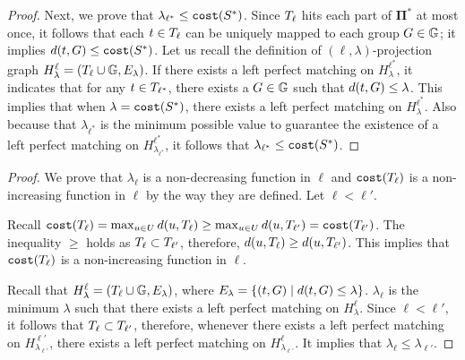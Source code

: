 \documentclass{article}
\begin{document}
\begin{proof}
Next, we prove that $\lambda_{\ell^*} \leq \texttt{cost}(S^*)$. 
Since $T_{\ell}$ hits each part of $\mathbf{\Pi}^*$ at most once, it follows that each $t \in T_{\ell}$ can be uniquely mapped to each group $G \in \mathbb{G}$; it implies $d(t, G) \leq \texttt{cost}(S^*)$.
Let us recall the definition of $(\ell,\lambda)$-projection graph $H^{\ell}_{\lambda} = (T_{\ell} \cup \mathbb{G}, E_{\lambda})$.
If there exists a left perfect matching on $H^{\ell^*}_{\lambda}$, it indicates that for any $t \in T_{\ell^*}$, there exists a $G \in \mathbb{G}$ such that $d(t, G) \leq \lambda$.
This implies that when $\lambda = \texttt{cost}(S^*)$, there exists a left perfect matching on $H^{\ell^*}_{\lambda}$.
Also because that $\lambda_{\ell^*}$ is the minimum possible value to guarantee the existence of a left perfect matching on $H^{\ell^*}_{\lambda_{\ell^*}}$, it follows that $\lambda_{\ell^*} \leq \texttt{cost}(S^*)$.
\end{proof}

\monotonicitypropertiesoflambdaell* 
\begin{proof}
    We prove that $\lambda_{\ell}$ is a non-decreasing function in $\ell$ and $\texttt{cost}(T_{\ell})$ is a non-increasing function in $\ell$ by the way they are defined. 
    Let $\ell < \ell'$.

    Recall $\texttt{cost}(T_{\ell}) = \max_{u \in U} d(u, T_{\ell}) \geq \max_{u \in U} d(u, T_{\ell'}) = \texttt{cost}(T_{\ell'})$. 
    The inequality $\geq$ holds as $T_{\ell} \subset T_{\ell'}$, therefore, $d(u, T_{\ell}) \geq d(u, T_{\ell'})$. 
    This implies that $\texttt{cost}(T_{\ell})$ is a non-increasing function in $\ell$.

    Recall that $H^{\ell}_{\lambda} = (T_{\ell} \cup \mathbb{G}, E_{\lambda})$, where $E_{\lambda} = \{(t, G) \mid d(t, G) \leq \lambda\}$. 
    $\lambda_{\ell}$ is the minimum $\lambda$ such that there exists a left perfect matching on $H^{\ell}_{\lambda}$.
    Since $\ell < \ell'$, it follows that $T_{\ell} \subset T_{\ell'}$, therefore, whenever there exists a left perfect matching on $H^{\ell'}_{\lambda_{\ell'}}$, there exists a left perfect matching on $H^{\ell}_{\lambda_{\ell'}}$.
    It implies that $\lambda_{\ell} \leq \lambda_{\ell'}$.
\end{proof}
\end{document}
